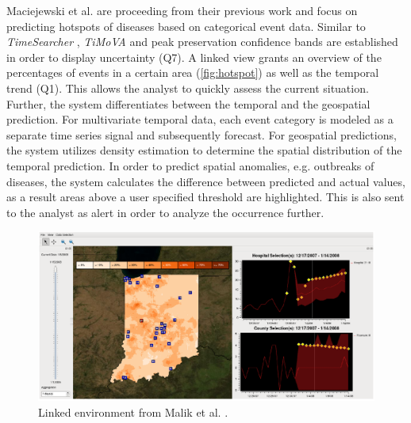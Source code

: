 \documentclass[electronic]{vgtc}             %
\begin{document}
Maciejewski et al. \cite{maciejewski:2011} are proceeding from their previous work \cite{maciejewski:2008, maciejewski:2007} and focus on predicting hotspots of diseases based on categorical event data.
Similar to \textit{TimeSearcher} \cite{buono:2007}, \textit{TiMoVA} \cite{boegl:2013} and peak preservation \cite{Hao:2012} confidence bands are established in order to display uncertainty (Q7).
A linked view grants an overview of the percentages of events in a certain area (\autoref{fig:hotspot}) as well as the temporal trend (Q1).
This allows the analyst to quickly assess the current situation.
Further, the system differentiates between the temporal and the geospatial prediction.
For multivariate temporal data, each event category is modeled as a separate time series signal and subsequently forecast. 
For geospatial predictions, the system utilizes density estimation to determine the spatial distribution of the temporal prediction. 
In order to predict spatial anomalies, e.g. outbreaks of diseases, the system calculates the difference between predicted and actual values, as a result areas above a user specified threshold are highlighted.
This is also sent to the analyst as alert in order to analyze the occurrence further.

\begin{figure}[b]
	\centering
	\includegraphics[width=\columnwidth]{Hotspot}
	\caption{Linked environment from Malik et al. \cite{maciejewski:2011}. 
	}
	\label{fig:hotspot}
\end{figure}
\end{document}
